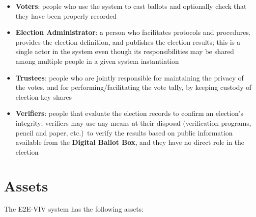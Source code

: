 \documentclass[10pt,letterpaper]{article}
\begin{document}
\begin{itemize}

    \item \textbf{Voters}: people who use the system to cast ballots and optionally check that they have been properly recorded

    \item \textbf{Election Administrator}: a person who facilitates protocols and procedures, provides the election definition, and publishes the election results; this is a single actor in the system even though its responsibilities may be shared among multiple people in a given system instantiation

    \item \textbf{Trustees}: people who are jointly responsible for maintaining the privacy of the votes, and for performing/facilitating the vote tally, by keeping custody of election key shares

    \item \textbf{Verifiers}: people that evaluate the election records to confirm an election's integrity; verifiers may use any means at their disposal (verification programs, pencil and paper, etc.)~to verify the results based on public information available from the \textbf{Digital Ballot Box}, and they have no direct role in the election

\end{itemize}

\section{Assets}

The E2E-VIV system has the following assets:
\end{document}
